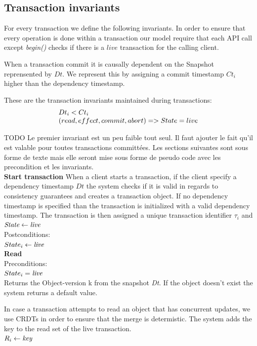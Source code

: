 \documentclass[systeme,french,english]{compas2022}
\begin{document}
\subsection{Transaction invariants}

For every transaction we define the following invariants.
In order to ensure that every operation is done within a transaction our model require that each API call except \emph{begin()} checks if there is a $live$ transaction for the calling client.

When a transaction commit it is causally dependent on the Snapshot reprensented by $Dt$.
We represent this by assigning a commit timestamp $Ct_i$ higher than the dependency timestamp.

These are the transaction invariants maintained during transactions:
\[
  \begin{array}{lcl}
    \emph{$Dt_i < Ct_i$}\\
    \emph{$(read, effect, commit, abort) => State = live$}
  \end{array} 
\]


TODO Le premier invariant est un peu faible tout seul. Il faut ajouter le fait qu'il est valable pour toutes transactions committées. Les sections suivantes sont sous forme de texte mais elle seront mise sous forme de pseudo code avec les precondition et les invariants.\\


\textbf{Start transaction}
When a client starts a transaction, if the client specify a dependency timestamp $Dt$ the system checks if it is valid in regards to consistency guarantees and creates a transaction object.
If no dependency timestamp is specified than the transaction is initialized with a valid dependency timestamp.
The transaction is then assigned a unique transaction identifier $\tau_i$ and $\emph{State} \leftarrow \emph{live}$ \\

Postconditions:\\
$State_i \leftarrow \emph{live}$ \\


\textbf{Read}\\
Preconditions:\\ 
$State_i = \emph{live}$ \\

Returns the Object-version k from the snapshot \emph{Dt}. 
If the object doesn't exist the system returns a default value.

In case a transaction attempts to read an object that has concurrent updates, we use CRDTs in order to ensure that the merge is determistic.
The system adds the key to the read set of the live transaction.\\
$R_i \leftarrow \emph{key}$\\
\end{document}
